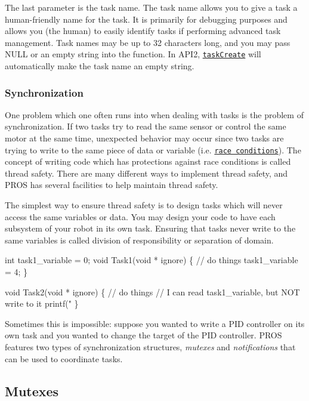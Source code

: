 The last parameter is the task name. The task name allows you to give a task a human-\/friendly name for the task. It is primarily for debugging purposes and allows you (the human) to easily identify tasks if performing advanced task management. Task names may be up to 32 characters long, and you may pass N\+U\+LL or an empty string into the function. In A\+P\+I2, \href{../../../cortex/api/index.html#taskCreate}{\tt task\+Create} will automatically make the task name an empty string.

\subsubsection*{Synchronization}

One problem which one often runs into when dealing with tasks is the problem of synchronization. If two tasks try to read the same sensor or control the same motor at the same time, unexpected behavior may occur since two tasks are trying to write to the same piece of data or variable (i.\+e. \href{https://en.wikipedia.org/wiki/Race_condition#Software}{\tt race conditions}). The concept of writing code which has protections against race conditions is called thread safety. There are many different ways to implement thread safety, and P\+R\+OS has several facilities to help maintain thread safety.

The simplest way to ensure thread safety is to design tasks which will never access the same variables or data. You may design your code to have each subsystem of your robot in its own task. Ensuring that tasks never write to the same variables is called division of responsibility or separation of domain.


\begin{DoxyCode}
int task1\_variable = 0;
void Task1(void * ignore) \{
    // do things
    task1\_variable = 4;
\}

void Task2(void * ignore) \{
  // do things
  // I can read task1\_variable, but NOT write to it
  printf("%
\}
\end{DoxyCode}


Sometimes this is impossible\+: suppose you wanted to write a P\+ID controller on its own task and you wanted to change the target of the P\+ID controller. P\+R\+OS features two types of synchronization structures, {\itshape mutexes} and {\itshape notifications} that can be used to coordinate tasks.

\subsection*{Mutexes}

